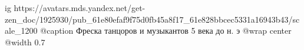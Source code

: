  
 
 
 
 

\ifcmt
  ig https://avatars.mds.yandex.net/get-zen_doc/1925930/pub_61e80efaf9f75d0fb45a8f17_61e828bbcec5331a16943b43/scale_1200
  @caption Фреска танцоров и музыкантов 5 века до н. э
	@wrap center
	@width 0.7
\fi
